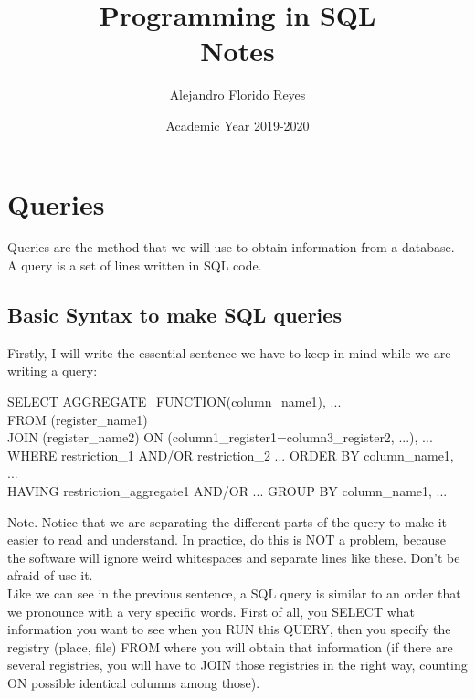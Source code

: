\documentclass[10pt, oneside]{article}
\title{Programming in SQL\\ Notes}
\author{Alejandro Florido Reyes}
\date{Academic Year 2019-2020}
\begin{document}
\maketitle
\tableofcontents

\vspace{.25in}

\section{Queries}

Queries are the method that we will use to obtain information from a database. A query is a set of lines written in SQL code.

\subsection{Basic Syntax to make SQL queries}

Firstly, I will write the essential sentence we have to keep in mind while we are writing a query:
\begin{center}
	SELECT AGGREGATE\_FUNCTION(column\_name1), ...\\
	FROM (register\_name1) \\
	JOIN (register\_name2) ON (column1\_register1=column3\_register2, ...), ... \\
	WHERE restriction\_1 AND/OR restriction\_2 ... ORDER BY column\_name1, ... \\
	HAVING restriction\_aggregate1 AND/OR ... GROUP BY column\_name1, ... \\
\end{center}

\color{blue}Note. \color{black}Notice that we are separating the different parts of the query to make it easier to read and understand. In practice, do this is NOT a problem, because the software will ignore weird whitespaces and separate lines like these. Don't be afraid of use it.
\\

	Like we can see in the previous sentence, a SQL query is similar to an order that we pronounce with a very specific words. First of all, you SELECT what information you want to see when you RUN this QUERY, then you specify the registry (place, file) FROM where you will obtain that information (if there are several registries, you will have to JOIN those registries in the right way, counting ON possible identical columns among those). 
	\\
	
\end{document}

